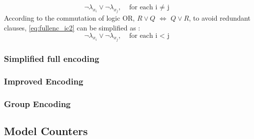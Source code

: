             \begin{equation}\label{eq:fullenc_ic2}
                \neg\lambda_{x_{i}} \vee \neg\lambda_{x_{j}}, \;\;\; \mbox{for each i $\neq$ j}
            \end{equation}
            According to the commutation of logic OR, $R \vee Q$ $\Longleftrightarrow$ $Q \vee R$, to avoid redundant clauses, \ref{eq:fullenc_ic2} can be simplified as :
            \begin{equation}\label{fullenc_ic3}
                \neg\lambda_{x_{i}} \vee \neg\lambda_{x_{j}}, \;\;\; \mbox{for each i $<$ j}
            \end{equation}

        \subsubsection{Simplified full encoding}
        \subsubsection{Improved Encoding}
        \subsubsection{Group Encoding}
    \subsection{Model Counters}
